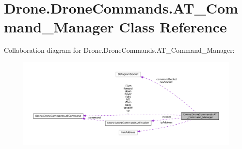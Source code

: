\hypertarget{class_drone_1_1_drone_commands_1_1_a_t___command___manager}{}\section{Drone.\+Drone\+Commands.\+A\+T\+\_\+\+Command\+\_\+\+Manager Class Reference}
\label{class_drone_1_1_drone_commands_1_1_a_t___command___manager}


Collaboration diagram for Drone.\+Drone\+Commands.\+A\+T\+\_\+\+Command\+\_\+\+Manager\+:\nopagebreak
\begin{figure}[H]
\begin{center}
\leavevmode
\includegraphics[width=350pt]{class_drone_1_1_drone_commands_1_1_a_t___command___manager__coll__graph}
\end{center}
\end{figure}
